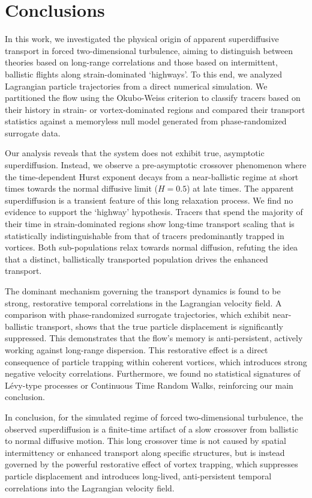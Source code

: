 \documentclass[]{article}
\begin{document}
\section{Conclusions}
\label{sec:conclusions}
In this work, we investigated the physical origin of apparent superdiffusive transport in forced two-dimensional turbulence, aiming to distinguish between theories based on long-range correlations and those based on intermittent, ballistic flights along strain-dominated `highways'. To this end, we analyzed Lagrangian particle trajectories from a direct numerical simulation. We partitioned the flow using the Okubo-Weiss criterion to classify tracers based on their history in strain- or vortex-dominated regions and compared their transport statistics against a memoryless null model generated from phase-randomized surrogate data.

Our analysis reveals that the system does not exhibit true, asymptotic superdiffusion. Instead, we observe a pre-asymptotic crossover phenomenon where the time-dependent Hurst exponent decays from a near-ballistic regime at short times towards the normal diffusive limit ($H=0.5$) at late times. The apparent superdiffusion is a transient feature of this long relaxation process. We find no evidence to support the `highway' hypothesis. Tracers that spend the majority of their time in strain-dominated regions show long-time transport scaling that is statistically indistinguishable from that of tracers predominantly trapped in vortices. Both sub-populations relax towards normal diffusion, refuting the idea that a distinct, ballistically transported population drives the enhanced transport.

The dominant mechanism governing the transport dynamics is found to be strong, restorative temporal correlations in the Lagrangian velocity field. A comparison with phase-randomized surrogate trajectories, which exhibit near-ballistic transport, shows that the true particle displacement is significantly suppressed. This demonstrates that the flow's memory is anti-persistent, actively working against long-range dispersion. This restorative effect is a direct consequence of particle trapping within coherent vortices, which introduces strong negative velocity correlations. Furthermore, we found no statistical signatures of Lévy-type processes or Continuous Time Random Walks, reinforcing our main conclusion.

In conclusion, for the simulated regime of forced two-dimensional turbulence, the observed superdiffusion is a finite-time artifact of a slow crossover from ballistic to normal diffusive motion. This long crossover time is not caused by spatial intermittency or enhanced transport along specific structures, but is instead governed by the powerful restorative effect of vortex trapping, which suppresses particle displacement and introduces long-lived, anti-persistent temporal correlations into the Lagrangian velocity field.


{}

\end{document}
